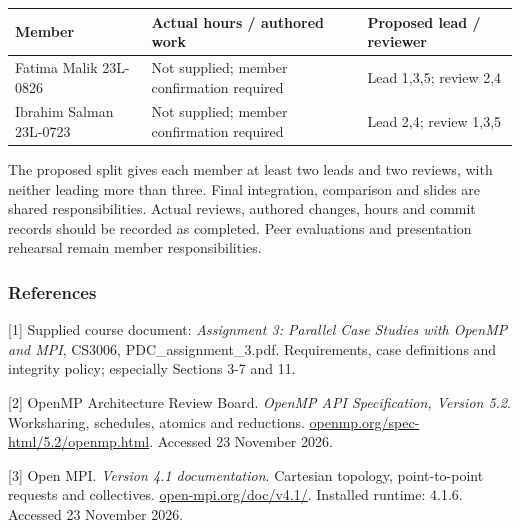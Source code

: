\documentclass[11pt,a4paper]{article}
\begin{document}
\begin{center}\small\setlength{\tabcolsep}{4pt}\renewcommand{\arraystretch}{1.12}

\begin{tabular}{@{}>{\raggedright\arraybackslash}p{}>{\raggedright\arraybackslash}p{}>{\raggedright\arraybackslash}p{}@{}}\toprule

\textbf{Member} & \textbf{Actual hours /\allowbreak{} authored work} & \textbf{Proposed lead /\allowbreak{} reviewer}\\\midrule

Fatima Malik\newline{} 23L-0826 & Not supplied; member confirmation required & Lead 1,3,5; review 2,4\\

Ibrahim Salman\newline{} 23L-0723 & Not supplied; member confirmation required & Lead 2,4; review 1,3,5\\

\bottomrule\end{tabular}\end{center}

The proposed split gives each member at least two leads and two reviews, with neither leading more than three. Final integration, comparison and slides are shared responsibilities. Actual reviews, authored changes, hours and commit records should be recorded as completed. Peer evaluations and presentation rehearsal remain member responsibilities.


\subsubsection*{References}

[1] Supplied course document: \emph{Assignment 3: Parallel Case Studies with OpenMP and MPI}, CS3006, PDC\_\allowbreak{}assignment\_\allowbreak{}3.pdf. Requirements, case definitions and integrity policy; especially Sections 3-7 and 11.


[2] OpenMP Architecture Review Board. \emph{OpenMP API Specification, Version 5.2}. Worksharing, schedules, atomics and reductions. \href{https://www.openmp.org/spec-html/5.2/openmp.html}{openmp.org/\allowbreak{}spec-html/\allowbreak{}5.2/\allowbreak{}openmp.html}. Accessed 23 November 2026.


[3] Open MPI. \emph{Version 4.1 documentation}. Cartesian topology, point-to-point requests and collectives. \href{https://www.open-mpi.org/doc/v4.1/}{open-mpi.org/\allowbreak{}doc/\allowbreak{}v4.1/\allowbreak{}}. Installed runtime: 4.1.6. Accessed 23 November 2026.
\end{document}
